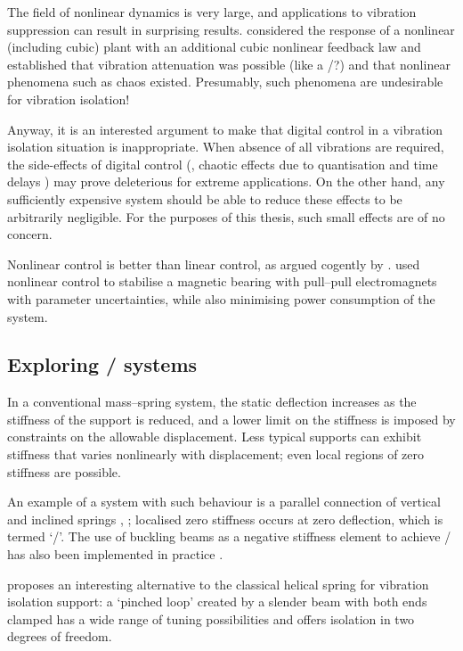 The field of nonlinear dynamics is very large, and applications to vibration suppression can result in surprising results.
\textcite{oueini1999} considered the response of a nonlinear (including cubic) plant with an additional cubic nonlinear feedback law and established that vibration attenuation was possible (like a \vibneut/?) and that nonlinear phenomena such as chaos existed.
Presumably, such phenomena are undesirable for vibration isolation!


\cite{zuo2004}

Anyway, it is an interested argument to make that digital control in a vibration isolation situation is inappropriate.
When absence of all vibrations are required, the side-effects of digital control (\ie, chaotic effects due to quantisation and time delays \cite{csernak2007}) may prove deleterious for extreme applications.
On the other hand, any sufficiently expensive system should be able to reduce these effects to be arbitrarily negligible.
For the purposes of this thesis, such small effects are of no concern.


Nonlinear control is better than linear control, as argued cogently by \textcite{kokotovic1992}.
\textcite{queiroz2007} used nonlinear control to stabilise a magnetic bearing with pull--pull electromagnets with parameter uncertainties, while also minimising power consumption of the system.


\subsection{Exploring \qzs/ systems}

In a conventional mass--spring system, the static deflection increases as the stiffness of the support is reduced, and a lower limit on the stiffness is imposed by constraints on the allowable displacement.
Less typical supports can exhibit stiffness that varies nonlinearly with displacement; even local regions of zero stiffness are possible.

An example of a system with such behaviour is a parallel connection of vertical and inclined springs \cite{molyneux1957,alabuzhev1989}, ; localised zero stiffness occurs at zero deflection, which is termed `\qzs/'.
The use of buckling beams as a negative stiffness element to achieve \qzs/ has also been implemented in practice \cite{platus1999,tarnai2003}.

\textcite{virgin2008} proposes an interesting alternative to the classical helical spring for vibration isolation support: a `pinched loop' created by a slender beam with both ends clamped has a wide range of tuning possibilities and offers isolation in two degrees of freedom.


